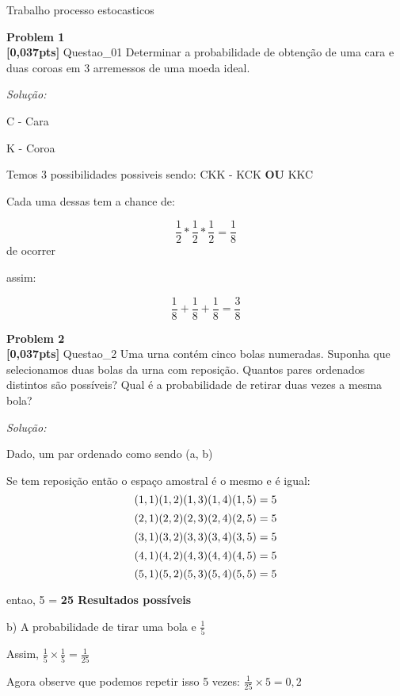\documentclass{article}
\newenvironment{problem}[2][Problem]
    { \begin{mdframed}[backgroundcolor=gray!20] \textbf{#1 #2} \\}
    {  \end{mdframed}}
\newenvironment{solution}
    {\textit{Solução:}}
    {}
\begin{document}
\begin{mdframed}[backgroundcolor=blue!20]
Trabalho processo estocasticos
\end{mdframed}

\begin{problem}{1}
\textbf{[0,037pts]} Questao\_01 Determinar a probabilidade de obtenção de uma cara e duas coroas em 3 arremessos de uma moeda ideal.

\end{problem}

\begin{solution}

C - Cara

K - Coroa

Temos 3 possibilidades possiveis sendo: CKK - KCK \textbf{OU} KKC

Cada uma dessas tem a chance de:

\[\frac{1}{2} * \frac{1}{2}  * \frac{1}{2} = \frac{1}{8}\] de ocorrer

assim:

\[\frac{1}{8} + \frac{1}{8}  + \frac{1}{8} = \frac{3}{8}\]

\end{solution}

\begin{problem}{2}
\textbf{[0,037pts]} Questao\_2 Uma urna contém cinco bolas numeradas. Suponha que selecionamos duas bolas da urna com reposição. Quantos pares ordenados distintos são possíveis? Qual é a probabilidade de retirar duas vezes a mesma bola?

\end{problem}

\begin{solution}

Dado, um par ordenado como sendo (a, b)

Se tem reposição então o espaço amostral é o mesmo e é igual:
\[ (1,1) (1,2) (1,3) (1,4) (1,5) = 5 \newline \]
\[ (2,1) (2,2) (2,3) (2,4) (2,5) = 5 \newline \]
\[ (3,1) (3,2) (3,3) (3,4) (3,5) = 5 \newline \]
\[ (4,1) (4,2) (4,3) (4,4) (4,5) = 5 \newline \]
\[ (5,1) (5,2) (5,3) (5,4) (5,5) = 5 \newline \]

entao, 5  = \textbf{25 Resultados possíveis}


b) A probabilidade de tirar uma bola e $\frac{1}{5}$

Assim, $\frac{1}{5} \times \frac{1}{5} = \frac{1}{25}$

Agora observe que podemos repetir isso 5 vezes: $\frac{1}{25} \times 5 = 0,2$

\end{solution}
\end{document}
